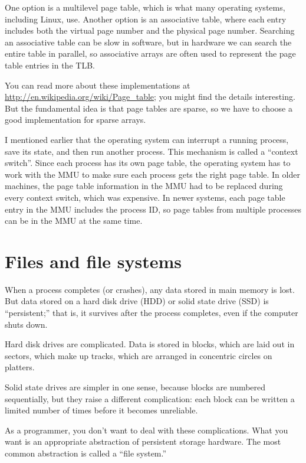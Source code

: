 \documentclass[12pt]{book}
\begin{document}
One option is a multilevel page table, which is what many operating
systems, including Linux, use.  Another option is an associative table, where each entry includes both the virtual page number and the physical page number.  Searching an associative table can be slow in software, but in hardware we
can search the entire table in parallel, so associative arrays are
often used to represent the page table entries in the TLB.

You can read more about these implementations at
\url{http://en.wikipedia.org/wiki/Page_table}; you might find the
details interesting.  But the fundamental idea is that page tables are
sparse, so we have to choose a good implementation for sparse arrays.

I mentioned earlier that the operating system can interrupt a running
process, save its state, and then run another process.  This mechanism
is called a ``context switch''.  Since each process has its own
page table, the operating system has to work with the MMU to make
sure each process gets the right page table.  In older machines,
the page table information in the MMU had to be replaced during every
context switch, which was expensive.  In newer systems, each page
table entry in the MMU includes the process ID, so page tables from
multiple processes can be in the MMU at the same time.



\chapter{Files and file systems}

When a process completes (or crashes), any data stored in main
memory is lost.  But data stored on a hard disk drive (HDD) or
solid state drive (SSD) is ``persistent;'' that is, it survives
after the process completes, even if the computer shuts down.

Hard disk drives are complicated.  Data is stored in blocks, which
are laid out in sectors, which make up tracks, which are arranged
in concentric circles on platters.

Solid state drives are simpler in one sense, because blocks are
numbered sequentially, but they raise a different complication: each
block can be written a limited number of times before it becomes
unreliable.

As a programmer, you don't want to deal with these complications.
What you want is an appropriate abstraction of persistent storage
hardware.  The most common abstraction is called a ``file system.''
\end{document}
